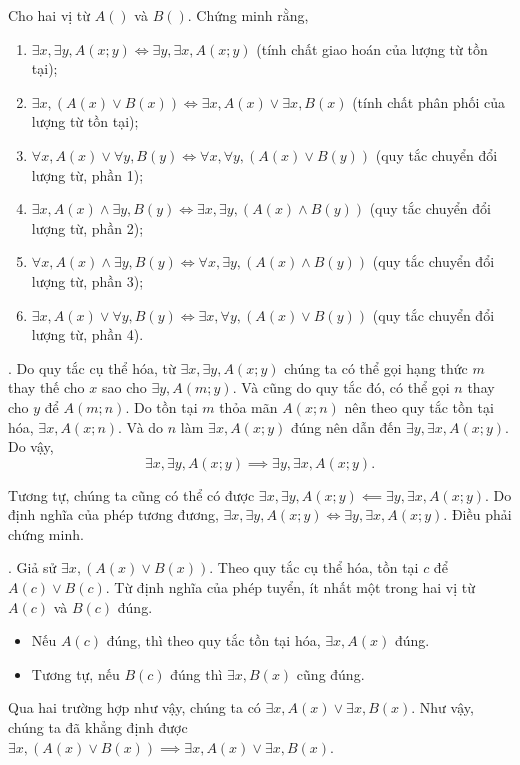 \exercise Cho hai vị từ $A()$ và $B()$. Chứng minh rằng, 
\begin{enumerate}
    \item $\exists x, \exists y, A(x; y) \iff \exists y, \exists x, A(x; y)$ (tính chất giao hoán của lượng từ tồn tại);
    \item $\exists x, (A(x) \lor B(x)) \iff \exists x, A(x) \lor \exists x, B(x)$ (tính chất phân phối của lượng từ tồn tại);
    \item $\forall x, A(x) \lor \forall y, B(y) \iff \forall x, \forall y, \left(A(x) \lor B(y)\right)$ (quy tắc chuyển đổi lượng từ, phần 1);
    \item $\exists x, A(x) \land \exists y, B(y) \iff \exists x, \exists y, (A(x) \land B(y))$ (quy tắc chuyển đổi lượng từ, phần 2);
    \item $\forall x, A(x) \land \exists y, B(y) \iff \forall x, \exists y, (A(x) \land B(y))$ (quy tắc chuyển đổi lượng từ, phần 3);
    \item $\exists x, A(x) \lor \forall y, B(y) \iff \exists x, \forall y, (A(x) \lor B(y))$ (quy tắc chuyển đổi lượng từ, phần 4).
\end{enumerate}

\solution

\setcounter{subexercise}{1}
. Do quy tắc cụ thể hóa, từ $\exists x, \exists y, A(x; y)$ chúng ta có thể gọi hạng thức $m$ thay thế cho $x$ sao cho $\exists y, A(m; y)$. Và cũng do quy tắc đó, có thể gọi $n$ thay cho $y$ để $A(m; n)$. Do tồn tại $m$ thỏa mãn $A(x; n)$ nên theo quy tắc tồn tại hóa, $\exists x, A(x; n)$. Và do $n$ làm $\exists x, A(x; y)$ đúng nên dẫn đến $\exists y, \exists x, A(x; y)$. Do vậy,
\begin{equation*}
    \exists x, \exists y, A(x; y) \implies \exists y, \exists x, A(x; y).
\end{equation*}

Tương tự, chúng ta cũng có thể có được $\exists x, \exists y, A(x; y) \impliedby \exists y, \exists x, A(x; y)$. Do định nghĩa của phép tương đương, $\exists x, \exists y, A(x; y) \iff \exists y, \exists x, A(x; y)$. Điều phải chứng minh.

. Giả sử $\exists x, (A(x) \lor B(x))$. Theo quy tắc cụ thể hóa, tồn tại $c$ để $A(c) \lor B(c)$. Từ định nghĩa của phép tuyển, ít nhất một trong hai vị từ $A(c)$ và $B(c)$ đúng.
\begin{itemize}
    \item Nếu $A(c)$ đúng, thì theo quy tắc tồn tại hóa, $\exists x, A(x)$ đúng.
    \item Tương tự, nếu $B(c)$ đúng thì $\exists x, B(x)$ cũng đúng.
\end{itemize}
Qua hai trường hợp như vậy, chúng ta có $\exists x, A(x) \lor \exists x, B(x)$. Như vậy, chúng ta đã khẳng định được $\exists x, (A(x) \lor B(x)) \implies \exists x, A(x) \lor \exists x, B(x)$.

